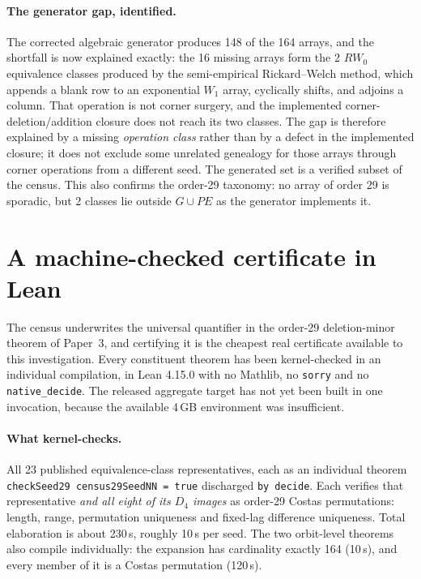 \documentclass[11pt,a4paper,oneside]{report}
\theoremstyle{definition}
\begin{document}
\paragraph{The generator gap, identified.}
The corrected algebraic generator produces 148 of the 164 arrays, and the
shortfall is now explained exactly: the 16 missing arrays form the 2 $RW_0$
equivalence classes produced by the semi-empirical Rickard--Welch method, which
appends a blank row to an exponential $W_1$ array, cyclically shifts, and adjoins
a column. That operation is not corner surgery, and the implemented
corner-deletion/addition closure does not reach its two classes. The gap is
therefore explained by a missing \emph{operation class} rather than by a defect
in the implemented closure; it does not exclude some unrelated genealogy for
those arrays through corner operations from a different seed. The generated set is a verified subset of the
census. This also confirms the order-29 taxonomy: no array of order 29 is
sporadic, but 2 classes lie outside $G\cup PE$ as the generator implements it.


\section{A machine-checked certificate in Lean}
\label{p4-sec:census29lean}

The census underwrites the universal quantifier in the order-29 deletion-minor theorem of Paper~3, and certifying it is the cheapest real certificate available to this investigation. Every constituent theorem has been kernel-checked in an individual compilation, in Lean 4.15.0
with no Mathlib, no \texttt{sorry} and no \texttt{native\_decide}. The released aggregate target
has not yet been built in one invocation, because the available 4\,GB environment was
insufficient.

\paragraph{What kernel-checks.} All 23 published equivalence-class
representatives, each as an individual theorem
\texttt{checkSeed29 census29SeedNN = true} discharged \texttt{by decide}. Each
verifies that representative \emph{and all eight of its $D_4$ images} as order-29
Costas permutations: length, range, permutation uniqueness and fixed-lag
difference uniqueness. Total elaboration is about 230\,s, roughly 10\,s per seed.
The two orbit-level theorems also compile individually: the expansion has
cardinality exactly 164 (10\,s), and every member of it is a Costas permutation
(120\,s).
\end{document}
